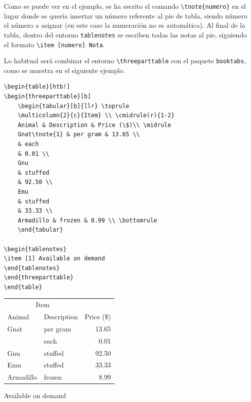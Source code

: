 \documentclass[12pt,a4paper, oneside]{report}
\begin{document}
Como se puede ver en el ejemplo, se ha escrito el comando \verb+\tnote{numero}+
en el lugar donde se quería insertar un número referente al pie de tabla, siendo
número el número a asignar (en este caso la numeración no es automática). Al
final de la tabla, dentro del entorno \verb+tablenotes+ se escriben todas las
notas al pie, siguiendo el formato \verb+\item [numero] Nota+.

Lo habitual será combinar el entorno \verb+\threeparttable+ con el paquete
\verb+booktabs+, como se muestra en el siguiente ejemplo.


\begin{lstlisting}
\begin{table}[htb!]
\begin{threeparttable}[b]
	\begin{tabular}[b]{llr} \toprule
	\multicolumn{2}{c}{Item} \\ \cmidrule(r){1-2}
	Animal & Description & Price (\$)\\ \midrule
	Gnat\tnote{1} & per gram & 13.65 \\
	& each
	& 0.01 \\
	Gnu
	& stuffed
	& 92.50 \\
	Emu
	& stuffed
	& 33.33 \\
	Armadillo & frozen & 8.99 \\ \bottomrule
	\end{tabular}

\begin{tablenotes}
\item [1] Available on demand
\end{tablenotes}
\end{threeparttable}
\end{table}
\end{lstlisting}


\begin{table}[htb!]
\begin{threeparttable}[b]
	\begin{tabular}[b]{llr} \toprule
	\multicolumn{2}{c}{Item} \\ \cmidrule(r){1-2}
	Animal & Description & Price (\$)\\ \midrule
	Gnat\tnote{1} & per gram & 13.65 \\
	& each
	& 0.01 \\
	Gnu
	& stuffed
	& 92.50 \\
	Emu
	& stuffed
	& 33.33 \\
	Armadillo & frozen & 8.99 \\ \bottomrule
	\end{tabular}

\begin{tablenotes}
\item [1] Available on demand
\end{tablenotes}
\end{threeparttable}
\end{table}
\end{document}
